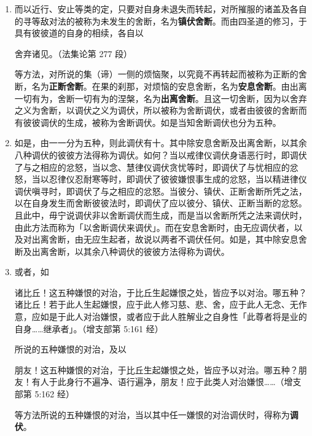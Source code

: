 \begin{enumerate}
\item 而以近行、安止等类的定，只要对自身未退失而转起，对所摧服的诸盖及各自的寻等敌对法的被称为未发生的舍断，名为\textbf{镇伏舍断}。而由四圣道的修习，于具有彼彼道的自身的相续，各自以\begin{quoting}舍弃诸见。（法集论第 277 段）\end{quoting}等方法，对所说的集（谛）一侧的烦恼聚，以究竟不再转起而被称为正断的舍断，名为\textbf{正断舍断}。在果的刹那，对烦恼的安息舍断，名为\textbf{安息舍断}。由出离一切有为，舍断一切有为的涅槃，名为\textbf{出离舍断}。且这一切舍断，因为以舍弃之义为舍断，以调伏之义为调伏，所以被称为舍断调伏，或者由彼彼的舍断而有彼彼调伏的生成，被称为舍断调伏。如是当知舍断调伏也分为五种。
\item 如是，由一一分为五种，则此调伏有十。其中除安息舍断及出离舍断，以其余八种调伏的彼彼方法得称为调伏。如何？当以戒律仪调伏身语恶行时，即调伏了与之相应的忿怒，当以念、慧律仪调伏贪忧等时，即调伏了与忧相应的忿怒，当以忍律仪忍耐寒等时，即调伏了彼彼嫌恨事生成的忿怒，当以精进律仪调伏嗔寻时，即调伏了与之相应的忿怒。当彼分、镇伏、正断舍断所凭之法，以在自身发生而舍断彼彼法时，即调伏了应以彼分、镇伏、正断当断的忿怒。且此中，毋宁说调伏非以舍断调伏而生成，而是当以舍断所凭之法来调伏时，由此方法而称为「以舍断调伏来调伏」。而在安息舍断时，由无应调伏者，以及对出离舍断，由无应生起者，故说以两者不调伏任何。如是，其中除安息舍断及出离舍断，以其余八种调伏的彼彼方法得称为调伏。
\item 或者，如\begin{quoting}诸比丘！这五种嫌恨的对治，于比丘生起嫌恨之处，皆应予以对治。哪五种？诸比丘！若于此人生起嫌恨，应于此人修习慈、悲、舍，应于此人无念、无作意，应如是于此人对治嫌恨，或者应于此人胜解业之自身性「此尊者将是业的自身……继承者」。（增支部第 5:161 经）\end{quoting}所说的五种嫌恨的对治，及以\begin{quoting}朋友！这五种嫌恨的对治，于比丘生起嫌恨之处，皆应予以对治。哪五种？朋友！有人于此身行不遍净、语行遍净，朋友！应于此类人对治嫌恨……（增支部第 5:162 经）\end{quoting}等方法所说的五种嫌恨的对治，当以其中任一嫌恨的对治调伏时，得称为\textbf{调伏}。

\end{enumerate}
